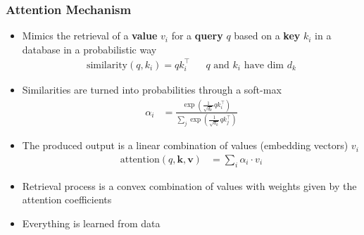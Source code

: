 \documentclass[10pt]{beamer}
\begin{document}
\begin{frame}
  \frametitle{Attention Mechanism}
 
\begin{itemize}[<+->]
\item Mimics the retrieval of a \textbf{value} $v_i$ for a \textbf{query} $q$
based on a \textbf{key} $k_i$ in a database in a probabilistic way
\begin{align*}
\text{similarity}(q,k_i) = q k_i^\top
& & \text{$q$ and $k_i$ have dim $d_k$}
\end{align*}
\item Similarities are turned into probabilities through a soft-max
\begin{align*}
\alpha_i & = \frac{\exp(\frac{1}{\sqrt{d_k}} q k_i^\top)}{\sum_j \exp(\frac{1}{\sqrt{d_k}}q k_j^\top)}
\end{align*}
\item The produced output is a linear combination of values (embedding vectors) $v_i$
\begin{align*}
\text{attention}(q,\textbf{k},\textbf{v}) & = \sum_i \alpha_i \cdot v_i
\end{align*}
\item Retrieval process is a convex combination of values with weights given by the attention coefficients
\item Everything is learned from data
\end{itemize}
\end{frame}
\end{document}
